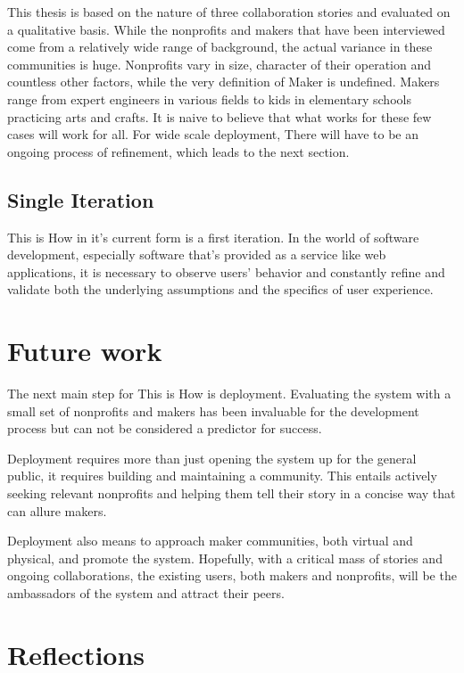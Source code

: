 This thesis is based on the nature of three collaboration stories and evaluated on a qualitative basis. While the nonprofits and makers that have been interviewed come from a relatively wide range of background, the actual variance in these communities is huge. Nonprofits vary in size, character of their operation and countless other factors, while the very definition of Maker is undefined. Makers range from expert engineers in various fields to kids in elementary schools practicing arts and crafts. It is naive to believe that what works for these few cases will work for all. For wide scale deployment, There will have to be an ongoing process of refinement, which leads to the next section.

\subsection{Single Iteration} 

This is How in it's current form is a first iteration. In the world of software development, especially software that's provided as a service like web applications, it is necessary to observe users' behavior and constantly refine and validate both the underlying assumptions and the specifics of user experience.

\section{Future work}

The next main step for This is How is deployment. Evaluating the system with a small set of nonprofits and makers has been invaluable for the development process but can not be considered a predictor for success.

Deployment requires more than just opening the system up for the general public, it requires building and maintaining a community. This entails actively seeking relevant nonprofits and helping them tell their story in a concise way that can allure makers. 

Deployment also means to approach maker communities, both virtual and physical, and promote the system. Hopefully, with a critical mass of stories and ongoing collaborations, the existing users, both makers and nonprofits, will be the ambassadors of the system and attract their peers.

\section{Reflections}

